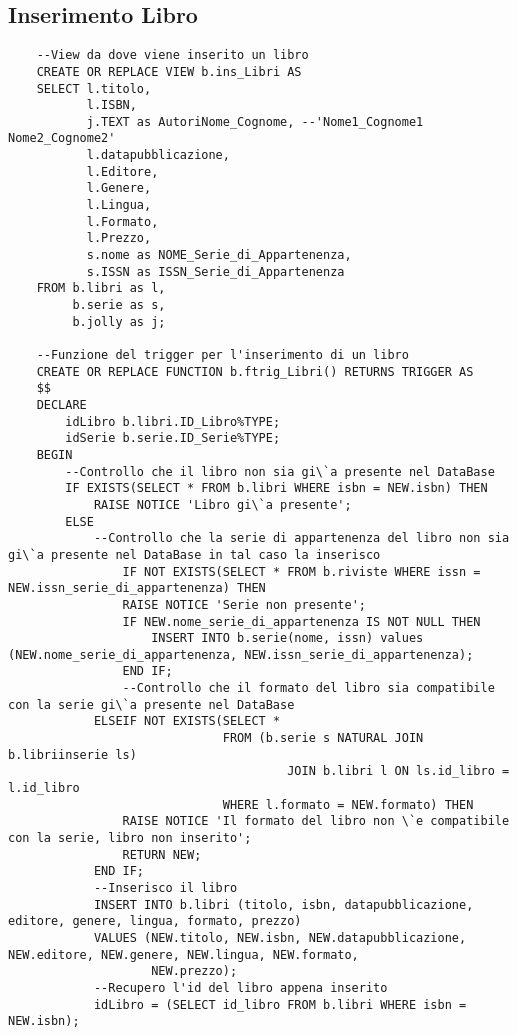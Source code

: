 \subsection{Inserimento Libro}
\begin{lstlisting}
    --View da dove viene inserito un libro
    CREATE OR REPLACE VIEW b.ins_Libri AS
    SELECT l.titolo,
           l.ISBN,
           j.TEXT as AutoriNome_Cognome, --'Nome1_Cognome1 Nome2_Cognome2'
           l.datapubblicazione,
           l.Editore,
           l.Genere,
           l.Lingua,
           l.Formato,
           l.Prezzo,
           s.nome as NOME_Serie_di_Appartenenza,
           s.ISSN as ISSN_Serie_di_Appartenenza
    FROM b.libri as l,
         b.serie as s,
         b.jolly as j;
    
    --Funzione del trigger per l'inserimento di un libro
    CREATE OR REPLACE FUNCTION b.ftrig_Libri() RETURNS TRIGGER AS
    $$
    DECLARE
        idLibro b.libri.ID_Libro%TYPE;
        idSerie b.serie.ID_Serie%TYPE;
    BEGIN
        --Controllo che il libro non sia gi\`a presente nel DataBase
        IF EXISTS(SELECT * FROM b.libri WHERE isbn = NEW.isbn) THEN
            RAISE NOTICE 'Libro gi\`a presente';
        ELSE
            --Controllo che la serie di appartenenza del libro non sia gi\`a presente nel DataBase in tal caso la inserisco
                IF NOT EXISTS(SELECT * FROM b.riviste WHERE issn = NEW.issn_serie_di_appartenenza) THEN
                RAISE NOTICE 'Serie non presente';
                IF NEW.nome_serie_di_appartenenza IS NOT NULL THEN
                    INSERT INTO b.serie(nome, issn) values (NEW.nome_serie_di_appartenenza, NEW.issn_serie_di_appartenenza);
                END IF;
                --Controllo che il formato del libro sia compatibile con la serie gi\`a presente nel DataBase
            ELSEIF NOT EXISTS(SELECT *
                              FROM (b.serie s NATURAL JOIN b.libriinserie ls)
                                       JOIN b.libri l ON ls.id_libro = l.id_libro
                              WHERE l.formato = NEW.formato) THEN
                RAISE NOTICE 'Il formato del libro non \`e compatibile con la serie, libro non inserito';
                RETURN NEW;
            END IF;
            --Inserisco il libro
            INSERT INTO b.libri (titolo, isbn, datapubblicazione, editore, genere, lingua, formato, prezzo)
            VALUES (NEW.titolo, NEW.isbn, NEW.datapubblicazione, NEW.editore, NEW.genere, NEW.lingua, NEW.formato,
                    NEW.prezzo);
            --Recupero l'id del libro appena inserito
            idLibro = (SELECT id_libro FROM b.libri WHERE isbn = NEW.isbn);
    

\end{lstlisting}

